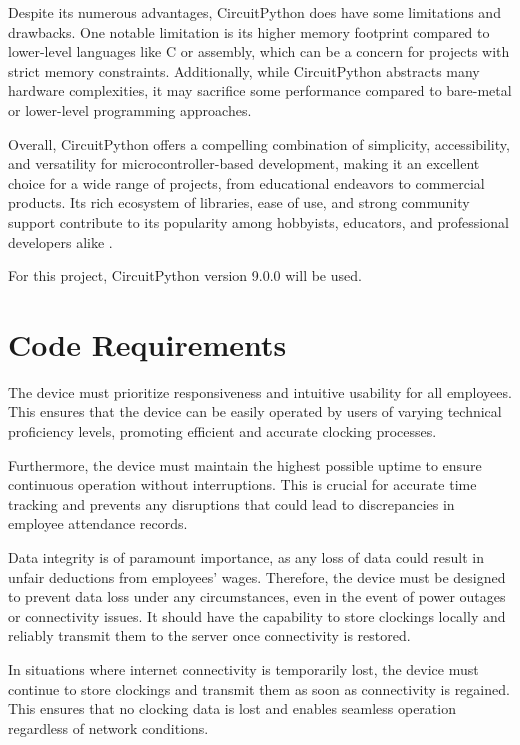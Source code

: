 Despite its numerous advantages, CircuitPython does have some limitations and drawbacks. One 
notable limitation is its higher memory footprint compared to lower-level languages like C or 
assembly, which can be a concern for projects with strict memory constraints. Additionally, while 
CircuitPython abstracts many hardware complexities, it may sacrifice some performance compared to 
bare-metal or lower-level programming approaches.

Overall, CircuitPython offers a compelling combination of simplicity, accessibility, and 
versatility for microcontroller-based development, making it an excellent choice for a wide range 
of projects, from educational endeavors to commercial products. Its rich ecosystem of libraries, 
ease of use, and strong community support contribute to its popularity among hobbyists, educators, 
and professional developers alike \cite{circuitpython_docs}.

For this project, CircuitPython version 9.0.0 will be used.

\section{Code Requirements}

The device must prioritize responsiveness and intuitive usability for all employees. This ensures 
that the device can be easily operated by users of varying technical proficiency levels, promoting 
efficient and accurate clocking processes.

Furthermore, the device must maintain the highest possible uptime to ensure continuous operation 
without interruptions. This is crucial for accurate time tracking and prevents any disruptions that 
could lead to discrepancies in employee attendance records.

Data integrity is of paramount importance, as any loss of data could result in unfair deductions 
from employees' wages. Therefore, the device must be designed to prevent data loss under any 
circumstances, even in the event of power outages or connectivity issues. It should have the 
capability to store clockings locally and reliably transmit them to the server once connectivity is 
restored.

In situations where internet connectivity is temporarily lost, the device must continue to store 
clockings and transmit them as soon as connectivity is regained. This ensures that no clocking data 
is lost and enables seamless operation regardless of network conditions.

